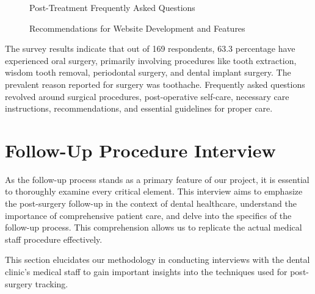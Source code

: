 \documentclass[12pt,oneside,openright,a4paper]{cpe-english-project}
\begin{document}
      \begin{figure}[!h]
        \centering
        \caption{Post-Treatment Frequently Asked Questions}\label{fig:Result_5}
      \end{figure}
      \begin{figure}[!h]
        \centering
        \caption{Recommendations for Website Development and Features}\label{fig:Result_6}
      \end{figure}
      \FloatBarrier{}
      \qquad The survey results indicate that out of 169 respondents, 63.3 percentage have experienced oral surgery, primarily involving procedures like tooth extraction, wisdom tooth removal, periodontal surgery, and dental implant surgery. The prevalent reason reported for surgery was toothache. Frequently asked questions revolved around surgical procedures, post-operative self-care, necessary care instructions, recommendations, and essential guidelines for proper care. \par
    
  \section{Follow-Up Procedure Interview}
    \qquad As the follow-up process stands as a primary feature of our project, it is essential to thoroughly examine every critical element. This interview aims to emphasize the post-surgery follow-up in the context of dental healthcare, understand the importance of comprehensive patient care, and delve into the specifics of the follow-up process. This comprehension allows us to replicate the actual medical staff procedure effectively.  \par
    \qquad This section elucidates our methodology in conducting interviews with the dental clinic's medical staff to gain important insights into the techniques used for post-surgery tracking. \par
\end{document}
